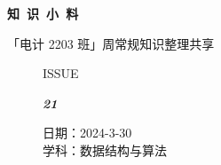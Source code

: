 \documentclass[UTF8]{ctexart}
\newcommand\Black[1]{\textcolor[gray]{0.3}{#1}}
\newcommand\Brown[1]{\textcolor[HTML]{998A4E}{#1}}
\newcommand\IssueNumber{21}
\newcommand\Date{2024-3-30}
\newcommand\Subject{数据结构与算法}
\begin{document}
\BgThispage
\begin{center}
\phantom{...}

{\Large\textcolor{brown!40!white}{}}

\vspace{-2em}

{\Huge\bfseries\TitleFont \Black{知\ 识\ 小\ 料}}


\vspace{-0.1cm}
{\footnotesize \Brown{「电计 2203 班」周常规知识整理共享}}
\end{center}

\vspace{-0.5cm}


\begin{figure}[H]
\hspace{1cm}
\begin{minipage}[t]{0.3\textwidth}
\centering
    \Brown{\Genshin ISSUE}

    \vspace{-0.6cm}
    \Huge \Issue\slshape\bfseries\Black{\IssueNumber}
\end{minipage}
\hfill
\begin{minipage}[t]{0.35\textwidth}
\centering
    \Brown{日期：\Date} \\
\vspace{-0.1cm}
    \Brown{学科：\Subject} \\
\end{minipage}
\hspace{0.8cm}
\end{figure}
\end{document}
